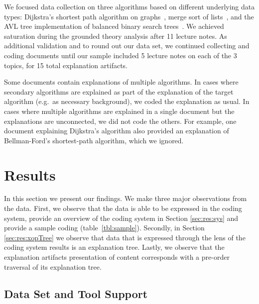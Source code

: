 \documentclass[sigconf]{acmart}
\begin{document}
We focused data collection on three algorithms based on different underlying
data types: Dijkstra's shortest path algorithm on
graphs~\cite[pp.~137--142]{KT06}, merge sort of lists~\cite[210--214]{KT06},
and the AVL tree implementation of balanced binary search
trees~\cite[pp.~458--475]{KnuthArt3}.
%
We achieved saturation during the grounded theory analysis after 11 lecture
notes. As additional validation and to round out our data set, we continued
collecting and coding documents until our sample included 5 lecture notes on
each of the 3 topics, for 15 total explanation artifacts.


Some documents contain explanations of multiple algorithms. In cases where
secondary algorithms are explained as part of the explanation of the target
algorithm (e.g.\ as necessary background), we coded the explanation as usual.
In cases where multiple algorithms are explained in a single document but the
explanations are unconnected, we did not code the others. For example, one
document explaining Dijkstra's algorithm also provided an explanation of
Bellman-Ford's shortest-path algorithm, which we ignored.





\section{Results}

In this section we present our findings. We make three major observations from
the data. First, we observe that the data is able to be expressed in the coding
system, provide an overview of the coding system in Section \ref{sec:res:sys}
and provide a sample coding (table~\ref{tbl:sample}). Secondly, in Section
\ref{sec:res:xopTree} we observe that data that is expressed through the lens of
the coding system results is an explanation tree. Lastly, we observe that the
explanation artifacts presentation of content corresponds with a pre-order
traversal of its explanation tree.

\subsection{Data Set and Tool Support}
\label{sec:res:data}
\end{document}
